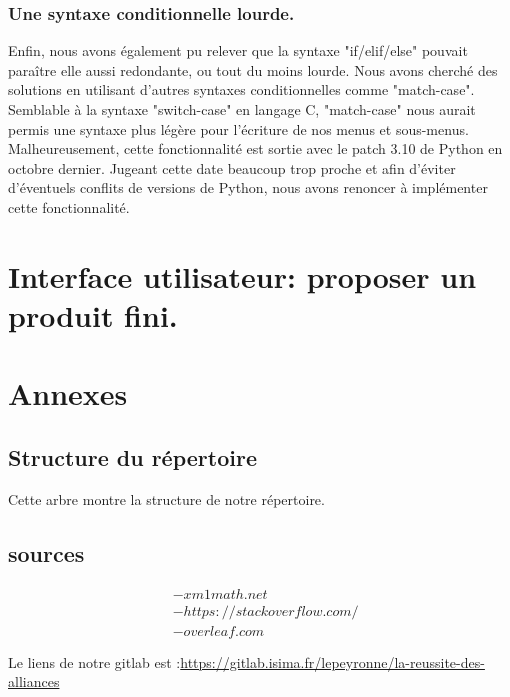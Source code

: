 \documentclass[10pt,a4paper,french,titlepage]{article}
\theoremstyle{definition}
\begin{document}
\subsubsection{Une syntaxe conditionnelle lourde.}
Enfin, nous avons également pu relever que la syntaxe "if/elif/else" pouvait paraître elle aussi redondante, ou tout du moins lourde. Nous avons cherché des solutions en utilisant d'autres syntaxes conditionnelles comme "match-case". Semblable à la syntaxe "switch-case" en langage C, "match-case" nous aurait permis une syntaxe plus légère pour l'écriture de nos menus et sous-menus. Malheureusement, cette fonctionnalité est sortie avec le patch 3.10 de Python en octobre dernier. Jugeant cette date beaucoup trop proche et afin d'éviter d'éventuels conflits de versions de Python, nous avons renoncer à implémenter cette fonctionnalité.
\section{Interface utilisateur: proposer un produit fini.}
\section{Annexes}
\subsection{Structure du répertoire}\label{arbre}

Cette arbre montre la structure de notre répertoire.\\
\hspace*{\fill}
%
     \hspace*{\fill}
\subsection{sources}
\begin{align*}
&-xm1math.net\\
&-https://stackoverflow.com/\\
&-overleaf.com
\end{align*}



Le liens de notre gitlab est :\url{https://gitlab.isima.fr/lepeyronne/la-reussite-des-alliances}
\end{document}

